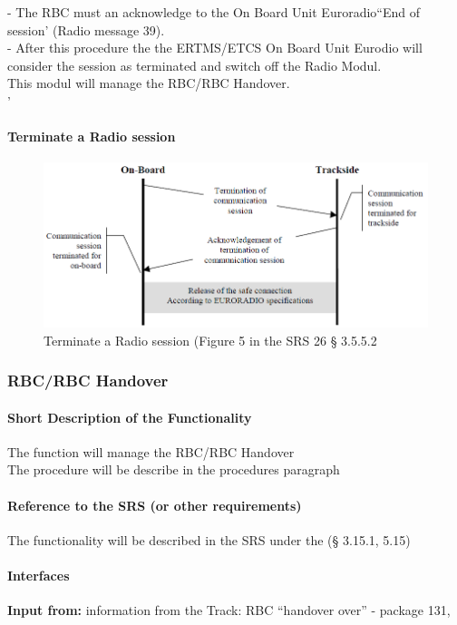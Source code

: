 \documentclass{template/openetcs_report}
\begin{document}
- The RBC must an acknowledge to the On Board Unit Euroradio``End of session' (Radio message 39).\\

- After this procedure the the ERTMS/ETCS On Board Unit Eurodio will consider the session as terminated and switch off the Radio Modul.\\

This modul will manage the RBC/RBC Handover.\\
' 
\paragraph{Terminate a Radio session}
\begin{figure}[hbtp]
\centering
\includegraphics [scale=0.5]{images/TerminationRadiosession}
\caption{Terminate a Radio session (Figure 5 in the SRS 26 § 3.5.5.2}
\end{figure}
\newpage

\subsubsection{RBC/RBC Handover}
\paragraph{Short Description of the Functionality}
The function will manage the RBC/RBC Handover\\
The procedure will be describe in the procedures paragraph\\

\paragraph{Reference to the SRS (or other requirements)}
The functionality will be described in the SRS under the (§ 3.15.1, 5.15)\\

\paragraph{Interfaces}
\textbf{Input from:} information from the Track: RBC ``handover over'' -  package 131, \\
\end{document}
